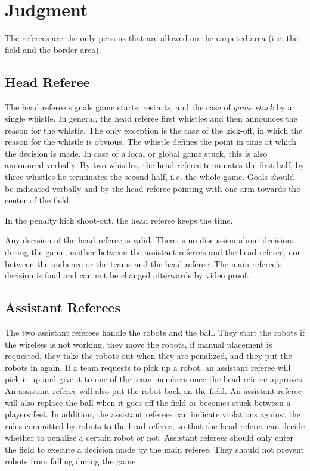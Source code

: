 \documentclass[12pt]{article}
\newcommand{\ie}{\mbox{i.\,e.}\xspace}
\begin{document}
\newpage


\section{Judgment}

The referees are the only persons that are allowed on the carpeted area (\ie the field and the border area).

\subsection{Head Referee}
\label{sec:head_referee}
The head referee signals game starts, restarts, and the case of \emph{game stuck} by a single whistle. In general, the head referee first whistles and then announces the reason for the whistle. The only exception is the case of the kick-off, in which the reason for the whistle is obvious. The whistle defines the point in time at which the decision is made. In case of a local or global game stuck, this is also announced verbally. By two whistles, the head referee terminates the first half; by three whistles he terminates the second half, \ie the whole game.  Goals should be indicated verbally and by the head referee pointing with one arm towards the center of the field.

In the penalty kick shoot-out, the head referee keeps the time.

Any decision of the head referee is valid. There is no discussion about decisions during the game, neither between the assistant referees and the head referee, nor between the audience or the teams and the head referee. The main referee's decision is final and can not be changed afterwards by video proof.

\subsection{Assistant Referees}
\label{sec:assist_referee}
The two assistant referees handle the robots and the ball. They start the robots if the wireless is not working, they move the robots, if manual placement is requested, they take the robots out when they are penalized, and they put the robots in again. If a team requests to pick up a robot, an assistant referee will pick it up and give it to one of the team members once the head referee approves. An assistant referee will also put the robot back on the field. An assistant referee will also replace the ball when it goes off the field or becomes stuck between a players feet.  In addition, the assistant referees can indicate violations against the rules committed by robots to the head referee, so that the head referee can decide whether to penalize a certain robot or not. Assistant referees should only enter the field to execute a decision made by the main referee. They should not prevent robots from falling during the game.
\end{document}
